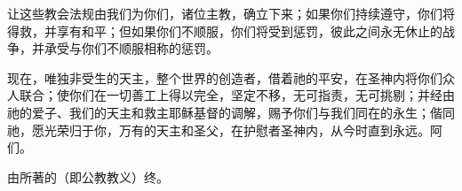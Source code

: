 让这些教会法规由我们为你们，诸位主教，确立下来；如果你们持续遵守，你们将得救，并享有和平；但如果你们不顺服，你们将受到惩罚，彼此之间永无休止的战争，并承受与你们不顺服相称的惩罚。\par

现在，唯独非受生的天主，整个世界的创造者，借着祂的平安，在圣神内将你们众人联合；使你们在一切善工上得以完全，坚定不移，无可指责，无可挑剔；并经由祂的爱子、我们的天主和救主耶稣基督的调解，赐予你们与我们同在的永生；偕同祂，愿光荣归于你，万有的天主和圣父，在护慰者圣神内，从今时直到永远。阿们。\par

由所著的（即公教教义）终。\par

